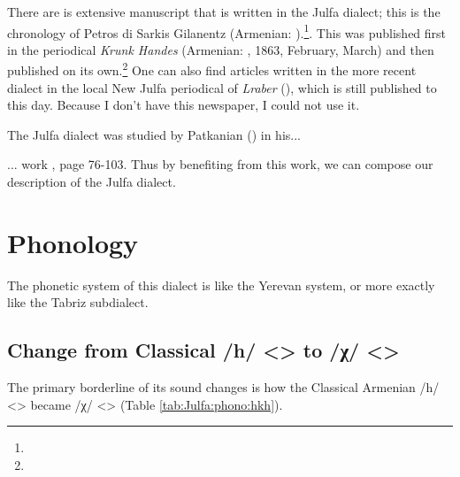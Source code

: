There are is extensive manuscript that is written in the Julfa dialect; this is the chronology of Petros di Sarkis Gilanentz (Armenian: ).\footnote{}. This was published first in the periodical \textit{Krunk Handes} (Armenian: , 1863, February, March) and then published on its own.\footnote{ } One can also find articles written in the more recent dialect in the local New Julfa periodical of \textit{Lraber} (\citeauthor{LraberNewJulfa}), which is still published to this day. Because I don't have this newspaper, I could not use it. 

The Julfa dialect was studied by Patkanian () in his... 

\begin{adjarianpage}\label{page:88}\end{adjarianpage}%

... work \citep[76-103]{Patkanian-1869-RussianDialects}, page 76-103. Thus by benefiting from this work, we can compose our description of the Julfa dialect. 

\section{Phonology}
The phonetic system of this dialect is like the Yerevan system, or more exactly like the Tabriz subdialect. 

\subsection{Change from Classical /h/ <> to /χ/ <>}

The primary borderline of its sound changes is how the Classical Armenian /h/ <> became /χ/ <> (Table \ref{tab:Julfa:phono:hkh}). 



